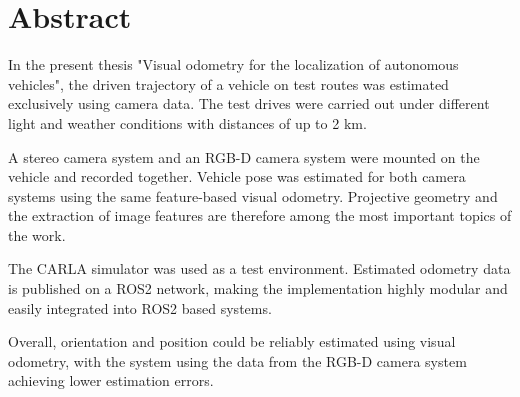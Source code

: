 

\section*{Abstract}
In the present thesis "Visual odometry for the localization of autonomous vehicles", the driven trajectory of a vehicle on test routes was estimated exclusively using camera data. The test drives were carried out under different light and weather conditions with distances of up to 2 km.
\newline

A stereo camera system and an RGB-D camera system were mounted on the vehicle and recorded together. Vehicle pose was estimated for both camera systems using the same feature-based visual odometry. Projective geometry and the extraction of image features are therefore among the most important topics of the work.
\newline 

The CARLA simulator was used as a test environment. Estimated odometry data is published on a ROS2 network, making the implementation highly modular and easily integrated into ROS2 based systems.
\newline 

Overall, orientation and position could be reliably estimated using visual odometry, with the system using the data from the RGB-D camera system achieving lower estimation errors.


